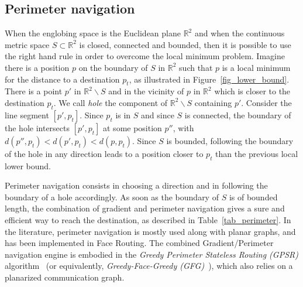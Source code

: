 \documentclass{article}
\begin{document}
\subsection{Perimeter navigation}
\label{sub_perimeter}

When the englobing space is the Euclidean plane $\mathbb{R}^2$ and when the continuous metric space $S\subset\mathbb{R}^2$ is closed, connected and bounded, then it is possible to use the right hand rule in order to overcome the local minimum problem. Imagine there is a position $p$ on the boundary of $S$ in $\mathbb{R}^2$ such that $p$ is a local minimum for the distance to a destination $p_t$, as illustrated in Figure~\ref{fig_lower_bound}. There is a point $p'$ in $\mathbb{R}^2\backslash S$ and in the vicinity of $p$ in $\mathbb{R}^2$ which is closer to the destination $p_t$. We call {\em hole} the component of $\mathbb{R}^2 \backslash S$ containing $p'$.
 Consider the line segment $[p',p_t]$. Since $p_t$ is in $S$ and since $S$ is connected, the boundary of the hole intersects $[p',p_t]$ at some position $p''$, with $d(p'',p_t)<d(p',p_t)<d(p,p_t)$. Since $S$ is bounded, following the boundary of the hole in any direction leads to a position closer to $p_t$ than the previous local lower bound.

Perimeter navigation consists in choosing a direction and in following the boundary of a hole accordingly. As soon as the boundary of $S$ is of bounded length, the combination of gradient and perimeter navigation gives a sure and efficient way to reach the destination, as described in Table~\ref{tab_perimeter}.
In the literature, perimeter navigation is mostly used along with planar graphs, and has been implemented in Face Routing. The combined Gradient/Perimeter navigation engine is embodied in the {\em Greedy Perimeter Stateless Routing (GPSR)} algorithm~\cite{bib_gpsr} (or equivalently, {\em Greedy-Face-Greedy (GFG)}~\cite{bib_gfg}), which also relies on a planarized communication graph.
\end{document}

